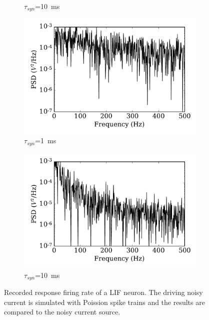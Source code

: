 \begin{figure}
\begin{subfigure}[t]{0.49\textwidth}
			\caption{$\tau_{syn}$=10~ms}
		\end{subfigure}
		\begin{subfigure}[t]{0.49\textwidth}
			\includegraphics[width=\textwidth]{pics_iconip/psd_tau1.pdf}
			\caption{$\tau_{syn}$=1~ms}
		\end{subfigure}
		\begin{subfigure}[t]{0.49\textwidth}
			\includegraphics[width=\textwidth]{pics_iconip/psd_tau10.pdf}
			\caption{$\tau_{syn}$=10~ms}
		\end{subfigure}
		\caption{Recorded response firing rate of a LIF neuron.
			The driving noisy current is simulated with Poission spike trains and the results are compared to the noisy current source.}
		\label{Fig:lif_pois}
	\end{figure}
	

	

